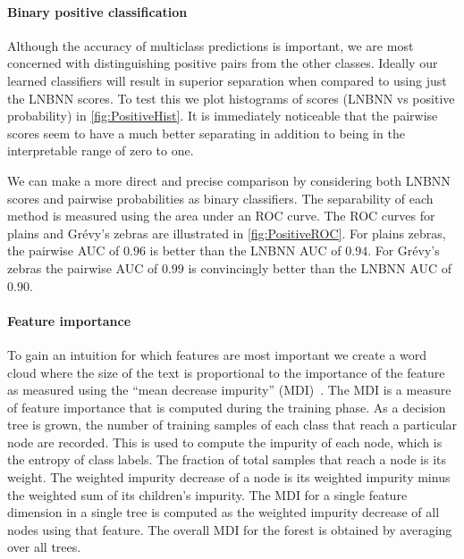         \ReRank{}
        
        \FloatBarrier{}
        \paragraph{Binary positive classification}
        Although the accuracy of multiclass predictions is important, we are most concerned with distinguishing
          positive pairs from the other classes.
        Ideally our learned classifiers will result in superior separation when compared to using just the LNBNN
          scores.
        To test this we plot histograms of scores (LNBNN vs positive probability) in \cref{fig:PositiveHist}.
        It is immediately noticeable that the pairwise scores seem to have a much better separating in addition
          to being in the interpretable range of zero to one.


        We can make a more direct and precise comparison by considering both LNBNN scores and pairwise
          probabilities as binary classifiers.
        The separability of each method is measured using the area under an ROC curve.
        The ROC curves for plains and Grévy's zebras are illustrated in \cref{fig:PositiveROC}.
        For plains zebras, the pairwise AUC of $0.96$ is better than the LNBNN AUC of $0.94$.
        For Grévy's zebras the pairwise AUC of $0.99$ is convincingly better than the LNBNN AUC of $0.90$.

        \PositiveHist{}

        \PositiveROC{}


        \paragraph{Feature importance}

        To gain an intuition for which features are most important we create a word cloud where the size of the
          text is proportional to the importance of the feature as measured using the ``mean decrease impurity''
          (MDI)~\cite{louppe2014understanding}.
        The MDI is a measure of feature importance that is computed during the training phase.
        As a decision tree is grown, the number of training samples of each class that reach a particular node
          are recorded.
        This is used to compute the impurity of each node, which is the entropy of class labels.
        The fraction of total samples that reach a node is its weight.
        The weighted impurity decrease of a node is its weighted impurity minus the weighted sum of its
          children's impurity.
        The MDI for a single feature dimension in a single tree is computed as the weighted impurity decrease of
          all nodes using that feature.
        The overall MDI for the forest is obtained by averaging over all trees.


